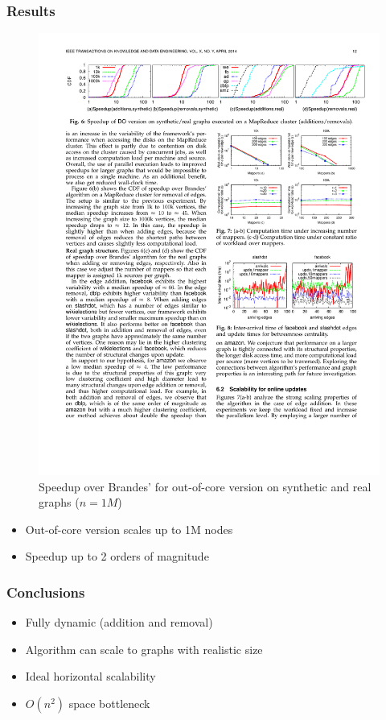\begin{frame}
  \frametitle{Results}

  \begin{figure}[t]
    \centering
    \includegraphics[width=\textwidth, height=0.6\textheight, keepaspectratio]{imgs/kdb-results2}
    \caption{Speedup over Brandes' for out-of-core version on synthetic and real graphs ($n = 1M$)}
  \end{figure}

  \begin{itemize}
    \item Out-of-core version scales up to 1M nodes
    \item Speedup up to 2 orders of magnitude
  \end{itemize}

\end{frame}

\begin{frame}
  \frametitle{Conclusions}

  \begin{itemize}
    \item Fully dynamic (addition and removal)
    \item Algorithm can scale to graphs with realistic size
    \item Ideal horizontal scalability
    \item $O(n^2)$ space bottleneck
  \end{itemize}
\end{frame}
